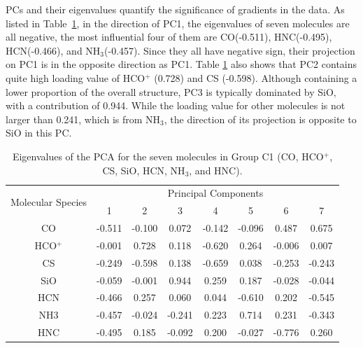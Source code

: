 \documentclass{aa}
\begin{document}
\begin{CJK*}{UTF8}{gbsn}
   PCs and their eigenvalues quantify the significance of gradients in the data. 
   As listed in Table~\ref{table-7-eigenvalue}, in the direction of PC1, the eigenvalues of seven molecules are all negative, the most influential four of them are CO(-0.511), HNC(-0.495), HCN(-0.466), and NH$_3$(-0.457).
   Since they all have negative sign, their projection on PC1 is in the opposite direction as PC1.
   Table \ref{table-7-eigenvalue} also shows that PC2 contains quite high loading value of HCO$^+$ (0.728) and CS (-0.598). 
   Although containing a lower proportion of the overall structure, PC3 is typically dominated by SiO, with a contribution of 0.944.
   While the loading value for other molecules is not larger than 0.241, which is from NH$_3$, the direction of its projection is opposite to SiO in this PC.



     \begin{table}[htbp]
        \centering
        \begin{tabular}{cccccccc}
        \hline\hline
        \multirow{2}{*}{Molecular Species} & \multicolumn{7}{c}{Principal Components}                 \\ \cline{2-8} 
                                           & 1       & 2       & 3       & 4       & 5      & 6    & 7\\ \hline
        CO                                  & -0.511 & -0.100 & 0.072  & -0.142 & -0.096 & 0.487  & 0.675  \\ \hline
        HCO$^+$                               & -0.001 & 0.728  & 0.118  & -0.620 & 0.264  & -0.006 & 0.007  \\ \hline
        CS                                 & -0.249 & -0.598 & 0.138  & -0.659 & 0.038   & -0.253 & -0.243 \\ \hline
        SiO                                & -0.059 & -0.001 & 0.944   & 0.259  & 0.187  & -0.028 & -0.044 \\ \hline
        HCN                                & -0.466 & 0.257  & 0.060    & 0.044  & -0.610 & 0.202   & -0.545 \\ \hline
        NH3                                & -0.457 & -0.024 & -0.241 & 0.223  & 0.714  & 0.231  & -0.343 \\ \hline
        HNC                                & -0.495 & 0.185  & -0.092 & 0.200  & -0.027 & -0.776 & 0.260 \\ \hline\hline
        \end{tabular}
        \caption{Eigenvalues of the PCA for the seven molecules in Group C1 (CO, HCO$^+$, CS, SiO, HCN, NH$_3$, and HNC).}
        \label{table-7-eigenvalue}
    \end{table}
   

\end{CJK*}
\end{document}

